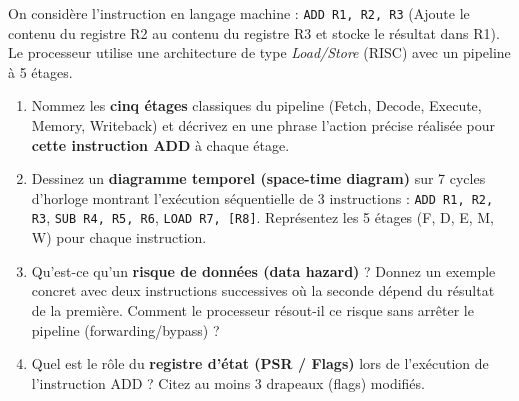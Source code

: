 \documentclass[11pt]{article}
\begin{document}
\begin{exercice}
On considère l'instruction en langage machine : \texttt{ADD R1, R2, R3} (Ajoute le contenu du registre R2 au contenu du registre R3 et stocke le résultat dans R1). Le processeur utilise une architecture de type \emph{Load/Store} (RISC) avec un pipeline à 5 étages.
\begin{enumerate}
    \item Nommez les \textbf{cinq étages} classiques du pipeline (Fetch, Decode, Execute, Memory, Writeback) et décrivez en une phrase l'action précise réalisée pour \textbf{cette instruction ADD} à chaque étage.
    \item Dessinez un \textbf{diagramme temporel (space-time diagram)} sur 7 cycles d'horloge montrant l'exécution séquentielle de 3 instructions : \texttt{ADD R1, R2, R3}, \texttt{SUB R4, R5, R6}, \texttt{LOAD R7, [R8]}. Représentez les 5 étages (F, D, E, M, W) pour chaque instruction.
    \item Qu'est-ce qu'un \textbf{risque de données (data hazard)} ? Donnez un exemple concret avec deux instructions successives où la seconde dépend du résultat de la première. Comment le processeur résout-il ce risque sans arrêter le pipeline (forwarding/bypass) ?
    \item Quel est le rôle du \textbf{registre d'état (PSR / Flags)} lors de l'exécution de l'instruction ADD ? Citez au moins 3 drapeaux (flags) modifiés.
\end{enumerate}
\end{exercice}
\end{document}
